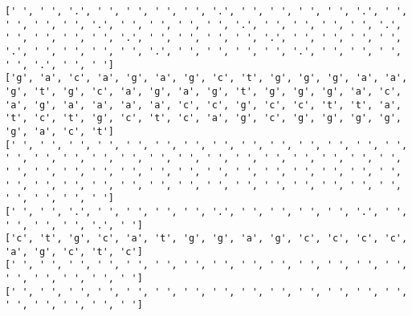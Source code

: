\documentclass{article}
\begin{document}
\begin{Verbatim}
[' ', ' ', '.', ' ', ' ', ' ', ' ', '.', ' ', ' ', ' ', ' ', '.', ' ', ' ', ' ', ' ', '.', ' ', ' ', ' ', ' ', '.', ' ', ' ', ' ', ' ', '.', ' ', ' ', ' ', ' ', '.', ' ', ' ', ' ', ' ', '.', ' ', ' ', ' ', ' ', '.', ' ', ' ', ' ', ' ', '.', ' ', ' ', ' ', ' ', '.', ' ', ' ', ' ', ' ', '.', ' ', ' ']
['g', 'a', 'c', 'a', 'g', 'a', 'g', 'c', 't', 'g', 'g', 'g', 'a', 'a', 'g', 't', 'g', 'c', 'a', 'g', 'a', 'g', 't', 'g', 'g', 'g', 'a', 'c', 'a', 'g', 'a', 'a', 'a', 'a', 'c', 'c', 'g', 'c', 'c', 't', 't', 'a', 't', 'c', 't', 'g', 'c', 't', 'c', 'a', 'g', 'c', 'g', 'g', 'g', 'g', 'g', 'a', 'c', 't']
[' ', ' ', ' ', ' ', ' ', ' ', ' ', ' ', ' ', ' ', ' ', ' ', ' ', ' ', ' ', ' ', ' ', ' ', ' ', ' ', ' ', ' ', ' ', ' ', ' ', ' ', ' ', ' ', ' ', ' ', ' ', ' ', ' ', ' ', ' ', ' ', ' ', ' ', ' ', ' ', ' ', ' ', ' ', ' ', ' ', ' ', ' ', ' ', ' ', ' ', ' ', ' ', ' ', ' ', ' ', ' ', ' ', ' ', ' ', ' ']
[' ', ' ', '.', ' ', ' ', ' ', ' ', '.', ' ', ' ', ' ', ' ', '.', ' ', ' ', ' ', ' ', '.', ' ']
['c', 't', 'g', 'c', 'a', 't', 'g', 'g', 'a', 'g', 'c', 'c', 'c', 'c', 'a', 'g', 'c', 't', 'c']
[' ', ' ', ' ', ' ', ' ', ' ', ' ', ' ', ' ', ' ', ' ', ' ', ' ', ' ', ' ', ' ', ' ', ' ', ' ']
[' ', ' ', ' ', ' ', ' ', ' ', ' ', ' ', ' ', ' ', ' ', ' ', ' ', ' ', ' ', ' ', ' ', ' ', ' ']
 

\end{Verbatim}
\end{document}
